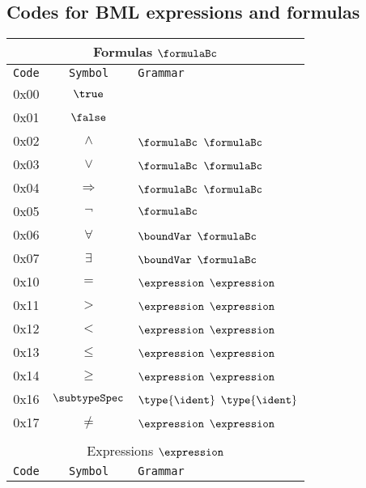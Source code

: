 \subsection{Codes for BML expressions and formulas}
\begin{center}
\begin{tabular}[t]{|c|c|l|}
\hline
\multicolumn{3}{|c|}{Formulas $\formulaBc $  } \\ 
\hline
\texttt{Code}&\texttt{Symbol}&\texttt{Grammar}\\
\hline
0x00 & $\true$  & \\
0x01 & $\false$ &\\
0x02 & $\wedge$ & $\formulaBc$ $\formulaBc$ \\
0x03 & $\vee$ & $\formulaBc$ $\formulaBc$ \\
0x04 & $\Rightarrow$ & $\formulaBc$ $\formulaBc$ \\
0x05 & $\neg$ & $\formulaBc$\\
0x06 & $\forall$ &  $ \boundVar$ $\formulaBc$ \\
0x07 & $\exists$ &  $ \boundVar$ $\formulaBc$ \\
0x10 & $= $ & $\expression$ $\expression$ \\
0x11 & $>  $ & $\expression$ $\expression$ \\
0x12 & $< $ & $\expression$ $\expression$ \\
0x13 & $\le $ & $\expression$ $\expression$ \\
0x14 & $\ge$ & $\expression$ $\expression$ \\
0x16 & $\subtypeSpec$ & $\type{\ident}$  $\type{\ident}$  \\
0x17 & $\neq$ & $\expression$ $\expression$ \\ 
& & \\
\hline
\multicolumn{3}{|c|}{Expressions $\expression$ } \\ 
\hline
\texttt{Code}&\texttt{Symbol}&\texttt{Grammar}\\
\hline


\end{tabular}
\end{center}
